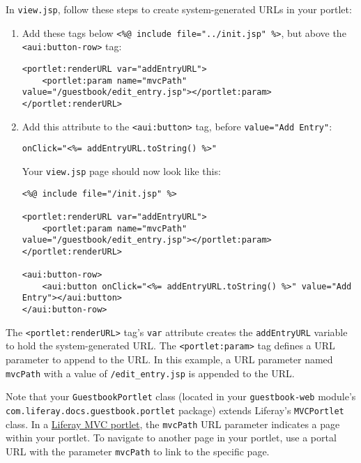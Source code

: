 In \texttt{view.jsp}, follow these steps to create system-generated URLs
in your portlet:

\begin{enumerate}
\def\labelenumi{\arabic{enumi}.}
\item
  Add these tags below
  \texttt{\textless{}\%@\ include\ file="../init.jsp"\ \%\textgreater{}},
  but above the \texttt{\textless{}aui:button-row\textgreater{}} tag:

\begin{verbatim}
<portlet:renderURL var="addEntryURL">
    <portlet:param name="mvcPath" value="/guestbook/edit_entry.jsp"></portlet:param>
</portlet:renderURL>
\end{verbatim}
\item
  Add this attribute to the \texttt{\textless{}aui:button\textgreater{}}
  tag, before \texttt{value="Add\ Entry"}:

\begin{verbatim}
onClick="<%= addEntryURL.toString() %>"
\end{verbatim}

  Your \texttt{view.jsp} page should now look like this:

\begin{verbatim}
<%@ include file="/init.jsp" %>

<portlet:renderURL var="addEntryURL">
    <portlet:param name="mvcPath" value="/guestbook/edit_entry.jsp"></portlet:param>
</portlet:renderURL>

<aui:button-row>
    <aui:button onClick="<%= addEntryURL.toString() %>" value="Add Entry"></aui:button>
</aui:button-row>
\end{verbatim}
\end{enumerate}

The \texttt{\textless{}portlet:renderURL\textgreater{}} tag's
\texttt{var} attribute creates the \texttt{addEntryURL} variable to hold
the system-generated URL. The
\texttt{\textless{}portlet:param\textgreater{}} tag defines a URL
parameter to append to the URL. In this example, a URL parameter named
\texttt{mvcPath} with a value of \texttt{/edit\_entry.jsp} is appended
to the URL.

Note that your \texttt{GuestbookPortlet} class (located in your
\texttt{guestbook-web} module's
\texttt{com.liferay.docs.guestbook.portlet} package) extends Liferay's
\texttt{MVCPortlet} class. In a
\href{/docs/7-2/appdev/-/knowledge_base/a/liferay-mvc-portlet}{Liferay
MVC portlet}, the \texttt{mvcPath} URL parameter indicates a page within
your portlet. To navigate to another page in your portlet, use a portal
URL with the parameter \texttt{mvcPath} to link to the specific page.

